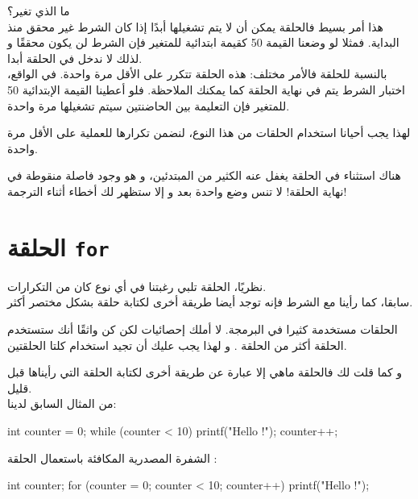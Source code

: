 ما الذي تغير؟\\
هذا أمر بسيط فالحلقة 
يمكن أن لا يتم تشغيلها أبدًا إذا كان الشرط غير محقق منذ البداية. فمثلا لو وضعنا القيمة 50 كقيمة ابتدائية للمتغير 
فإن الشرط لن يكون محققًا و لذلك لا ندخل في الحلقة أبدا.\\
بالنسبة للحلقة 
فالأمر مختلف: هذه الحلقة تتكرر على الأقل مرة واحدة. في الواقع، اختبار الشرط يتم في نهاية الحلقة كما يمكنك الملاحظة. فلو أعطينا القيمة الإبتدائية 50 للمتغير 
فإن التعليمة بين الحاضنتين سيتم تشغيلها مرة واحدة. 

لهذا يجب أحيانا استخدام الحلقات من هذا النوع، لنضمن تكرارها للعملية على الأقل مرة واحدة.

\begin{warning}
هناك استثناء في الحلقة 
يغفل عنه الكثير من المبتدئين، و هو وجود فاصلة منقوطة في نهاية الحلقة! لا تنس وضع واحدة بعد 
و إلا ستظهر لك أخطاء أثناء الترجمة!
\end{warning}

\section{الحلقة \texttt{for}}

نظريًا، الحلقة
تلبي رغبتنا في أي نوع كان من التكرارات.\\
سابقا، كما رأينا مع الشرط 
فإنه توجد أيضا  طريقة أخرى لكتابة حلقة بشكل مختصر أكثر.

الحلقات 
مستخدمة كثيرا في البرمجة. لا أملك إحصائيات لكن كن واثقًا أنك ستستخدم الحلقة 
أكثر من الحلقة 
.
و لهذا يجب عليك أن تجيد استخدام كلتا الحلقتين.

و كما قلت لك فالحلقة 
ماهي إلا عبارة عن طريقة أخرى لكتابة الحلقة
التي رأيناها قبل قليل.\\
من المثال السابق لدينا:

\begin{Csource}
int counter = 0;
while (counter < 10)
{
	printf("Hello !\n");
	counter++;
}
\end{Csource}

الشفرة المصدرية المكافئة باستعمال الحلقة
:

\begin{Csource}
int counter;
for (counter = 0; counter < 10; counter++)
{
	printf("Hello !\n");
}
\end{Csource}

